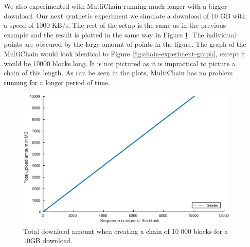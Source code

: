 We also experimented with MutliChain running much longer with a bigger download.
Our next synthetic experiment we simulate a download of 10 GB with a speed of 1000 KB/s.
The rest of the setup is the same as in the previous example
and the result is plotted in the same way in Figure \ref{fig:chain-experiment-amounts-long}.
The individual points are obscured by the large amount of points in the figure.
The graph of the MultiChain would look identical to Figure \ref{fig:chain-experiment-graph},
except it would be 10000 blocks long.
It is not pictured as it is impractical to picture a chain of this length.
As can be seen in the plots, MultiChain has no problem running for a longer period of time.

\begin{figure}
\centerline{\includegraphics[scale=0.5]{experimentation/chain/long/chain-down.eps}}
\caption{Total download amount when creating a chain of 10 000 blocks for a 10GB download.}
\label{fig:chain-experiment-amounts-long}
\end{figure}